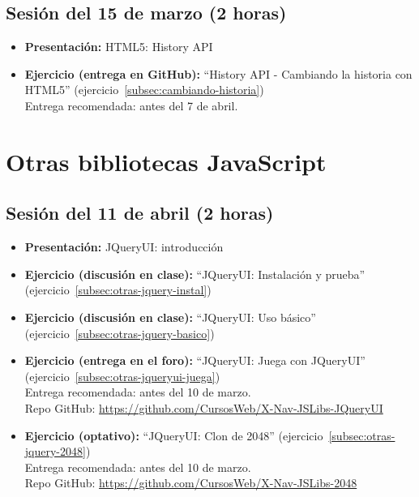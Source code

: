 \documentclass[a4paper,12pt]{report}
\begin{document}
\subsection{Sesión del 15 de marzo (2 horas)}

\begin{itemize}
 \item \textbf{Presentación:} HTML5: History API
 \item \textbf{Ejercicio (entrega en GitHub):} ``History API - Cambiando la historia con HTML5''
(ejercicio~\ref{subsec:cambiando-historia}) \\
 Entrega recomendada: antes del 7 de abril.
\end{itemize}


\section{Otras bibliotecas JavaScript}

\subsection{Sesión del 11 de abril (2 horas)}

\begin{itemize}
\item \textbf{Presentación:} JQueryUI: introducción
\item \textbf{Ejercicio (discusión en clase):} ``JQueryUI: Instalación y prueba'' (ejercicio~\ref{subsec:otras-jquery-instal})
\item \textbf{Ejercicio (discusión en clase):} ``JQueryUI: Uso básico'' (ejercicio~\ref{subsec:otras-jquery-basico}) \\
\item \textbf{Ejercicio (entrega en el foro):} ``JQueryUI: Juega con JQueryUI'' (ejercicio~\ref{subsec:otras-jqueryui-juega}) \\
  Entrega recomendada: antes del 10 de marzo. \\
  Repo GitHub: \url{https://github.com/CursosWeb/X-Nav-JSLibs-JQueryUI}
\item \textbf{Ejercicio (optativo):} ``JQueryUI: Clon de 2048'' (ejercicio~\ref{subsec:otras-jquery-2048}) \\
  Entrega recomendada: antes del 10 de marzo. \\
  Repo GitHub: \url{https://github.com/CursosWeb/X-Nav-JSLibs-2048}
\end{itemize}
\end{document}
